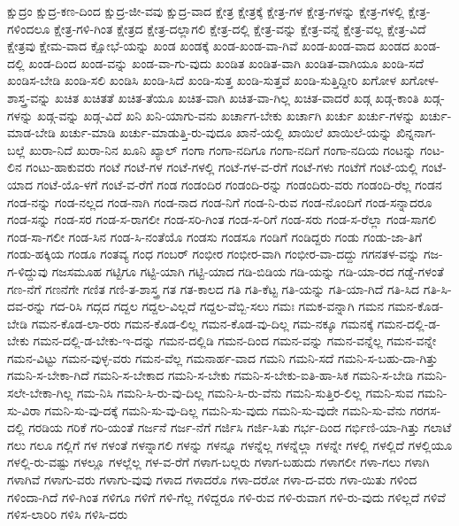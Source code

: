 {ಕ್ಷುದ್ರಂ
ಕ್ಷುದ್ರ-ಕಣ-ದಿಂದ
ಕ್ಷುದ್ರ-ಜೀ-ವವು
ಕ್ಷುದ್ರ-ವಾದ
ಕ್ಷೇತ್ರ
ಕ್ಷೇತ್ರಕ್ಕೆ
ಕ್ಷೇತ್ರ-ಗಳ
ಕ್ಷೇತ್ರ-ಗಳನ್ನು
ಕ್ಷೇತ್ರ-ಗಳಲ್ಲಿ
ಕ್ಷೇತ್ರ-ಗಳಿಂದಲೂ
ಕ್ಷೇತ್ರ-ಗಳಿ-ಗಿಂತ
ಕ್ಷೇತ್ರದ
ಕ್ಷೇತ್ರ-ದಲ್ಲಾಗಲಿ
ಕ್ಷೇತ್ರ-ದಲ್ಲಿ
ಕ್ಷೇತ್ರ-ವನ್ನು
ಕ್ಷೇತ್ರ-ವನ್ನೆ
ಕ್ಷೇತ್ರ-ವಲ್ಲ
ಕ್ಷೇತ್ರ-ವಿದೆ
ಕ್ಷೇತ್ರವು
ಕ್ಷೇಮ-ವಾದ
ಕ್ಷೋಭೆ-ಯನ್ನು
ಖಂಡ
ಖಂಡಕ್ಕೆ
ಖಂಡ-ಖಂಡ-ವಾ-ಗಿವೆ
ಖಂಡ-ಖಂಡ-ವಾದ
ಖಂಡದ
ಖಂಡ-ದಲ್ಲಿ
ಖಂಡ-ದಿಂದ
ಖಂಡ-ವನ್ನು
ಖಂಡ-ವಾ-ಗು-ವುದು
ಖಂಡಿತ
ಖಂಡಿತ-ವಾಗಿ
ಖಂಡಿತ-ವಾಗಿಯೂ
ಖಂಡಿ-ಸದೆ
ಖಂಡಿಸ-ಬೇಡಿ
ಖಂಡಿ-ಸಲಿ
ಖಂಡಿಸಿ
ಖಂಡಿ-ಸಿದೆ
ಖಂಡಿ-ಸುತ್ತ
ಖಂಡಿ-ಸುತ್ತವೆ
ಖಂಡಿ-ಸುತ್ತಿದ್ದೀರಿ
ಖಗೋಳ
ಖಗೋಳ-ಶಾಸ್ತ್ರ-ವನ್ನು
ಖಚಿತ
ಖಚಿತತೆ
ಖಚಿತ-ತೆಯೂ
ಖಚಿತ-ವಾಗಿ
ಖಚಿತ-ವಾ-ಗಿಲ್ಲ
ಖಚಿತ-ವಾದರೆ
ಖಡ್ಗ
ಖಡ್ಗ-ಕಾಂತಿ
ಖಡ್ಗ-ಗಳನ್ನು
ಖಡ್ಗ-ವನ್ನು
ಖಡ್ಗ-ವಿದೆ
ಖನಿ
ಖನಿ-ಯಾಗು-ವನು
ಖರ್ಚಾಗ-ಬೇಕು
ಖರ್ಚಾಗಿ
ಖರ್ಚು
ಖರ್ಚು-ಗಳನ್ನು
ಖರ್ಚು-ಮಾಡ-ಬೇಡಿ
ಖರ್ಚು-ಮಾಡಿ
ಖರ್ಚು-ಮಾಡುತ್ತಿ-ರು-ವುದೂ
ಖಾನೆ-ಯಲ್ಲಿ
ಖಾಯಿಲೆ
ಖಾಯಿಲೆ-ಯನ್ನು
ಖಿನ್ನನಾಗ-ಬಲ್ಲೆ
ಖುರಾ-ನಿದೆ
ಖುರಾ-ನಿನ
ಖೂನಿ
ಖ್ಯಾಲ್
ಗಂಗಾ
ಗಂಗಾ-ನದಿಗೂ
ಗಂಗಾ-ನದಿಗೆ
ಗಂಗಾ-ನದಿಯ
ಗಂಟನ್ನು
ಗಂಟ-ಲಿನ
ಗಂಟು-ಹಾಕುವರು
ಗಂಟೆ
ಗಂಟೆ-ಗಳ
ಗಂಟೆ-ಗಳಲ್ಲಿ
ಗಂಟೆ-ಗಳ-ವ-ರೆಗೆ
ಗಂಟೆ-ಗಳು
ಗಂಟೆಗೆ
ಗಂಟೆ-ಯಲ್ಲಿ
ಗಂಟೆ-ಯಾದ
ಗಂಟೆ-ಯೊ-ಳಗೆ
ಗಂಟೆ-ವ-ರೆಗೆ
ಗಂಡ
ಗಂಡಂದಿರ
ಗಂಡಂದಿ-ರನ್ನು
ಗಂಡಂದಿರು-ವರು
ಗಂಡಂದಿ-ರೆಲ್ಲ
ಗಂಡನ
ಗಂಡ-ನನ್ನು
ಗಂಡ-ನಲ್ಲದ
ಗಂಡ-ನಾಗಿ
ಗಂಡ-ನಾದ
ಗಂಡ-ನಿಗೆ
ಗಂಡ-ನಿ-ರುವ
ಗಂಡ-ನೊಂದಿಗೆ
ಗಂಡ-ಸನ್ನಾದರೂ
ಗಂಡ-ಸನ್ನು
ಗಂಡ-ಸರ
ಗಂಡ-ಸ-ರಾಗಲೀ
ಗಂಡ-ಸರಿ-ಗಿಂತ
ಗಂಡ-ಸ-ರಿಗೆ
ಗಂಡ-ಸರು
ಗಂಡ-ಸ-ರೆಲ್ಲಾ
ಗಂಡ-ಸಾಗಲಿ
ಗಂಡ-ಸಾ-ಗಲೀ
ಗಂಡ-ಸಿನ
ಗಂಡ-ಸಿ-ನಂತೆಯೊ
ಗಂಡಸು
ಗಂಡಸೂ
ಗಂಡಿಗೆ
ಗಂಡಿದ್ದರು
ಗಂಡು
ಗಂಡು-ಜಾ-ತಿಗೆ
ಗಂಡು-ಹಕ್ಕಿಯ
ಗಂಡೂ
ಗಂತವ್ಯ
ಗಂಧ
ಗಂಬರ್
ಗಂಭೀರ
ಗಂಭೀರ-ವಾಗಿ
ಗಂಭೀರ-ವಾ-ದದ್ದು
ಗಗನತಳ-ವನ್ನು
ಗಜ-ಗ-ಳಿದ್ದುವು
ಗಜಸಮೂಹ
ಗಟ್ಟಿಗೂ
ಗಟ್ಟಿ-ಯಾಗಿ
ಗಟ್ಟಿ-ಯಾದ
ಗಡಿ-ಬಿಡಿಯ
ಗಡಿ-ಯನ್ನು
ಗಡಿ-ಯಾ-ರದ
ಗಡ್ಡೆ-ಗಳಂತೆ
ಗಣ-ನೆಗೆ
ಗಣನೆಗೇ
ಗಣಿತ
ಗಣಿ-ತ-ಶಾಸ್ತ್ರ
ಗತ
ಗತ-ಕಾಲದ
ಗತಿ
ಗತಿ-ಕೆಟ್ಟ
ಗತಿ-ಯನ್ನು
ಗತಿ-ಯಾ-ಗಿದೆ
ಗತಿ-ಸಿದ
ಗತಿ-ಸಿ-ದವ-ರನ್ನು
ಗದ-ರಿಸಿ
ಗದ್ಗದ
ಗದ್ದಲ
ಗದ್ದಲ-ವಿಲ್ಲದೆ
ಗದ್ದಲ-ವೆಬ್ಬಿ-ಸಲು
ಗಮಃ
ಗಮಕ-ವನ್ನಾಗಿ
ಗಮನ
ಗಮನ-ಕೊಡ-ಬೇಡಿ
ಗಮನ-ಕೊಡ-ಲಾ-ರರು
ಗಮನ-ಕೊಡ-ಲಿಲ್ಲ
ಗಮನ-ಕೊಡ-ವು-ದಿಲ್ಲ
ಗಮ-ನಕ್ಕೂ
ಗಮನಕ್ಕೆ
ಗಮನ-ದಲ್ಲಿ-ಡ-ಬೇಕು
ಗಮನ-ದಲ್ಲಿ-ಡ-ಬೇಕು-ಇ-ದನ್ನು
ಗಮನ-ದಲ್ಲಿಡಿ
ಗಮನ-ದಿಂದ
ಗಮನ-ವನ್ನು
ಗಮನ-ವನ್ನೆಲ್ಲ
ಗಮನ-ವನ್ನೇ
ಗಮನ-ವಿಟ್ಟು
ಗಮನ-ವುಳ್ಳ-ವರು
ಗಮನ-ವೆಲ್ಲ
ಗಮನಾರ್ಹ-ವಾದ
ಗಮನಿ
ಗಮನಿ-ಸದೆ
ಗಮನಿ-ಸ-ಬಹು-ದಾ-ಗಿತ್ತು
ಗಮನಿ-ಸ-ಬೇಕಾ-ಗಿದೆ
ಗಮನಿ-ಸ-ಬೇಕಾದ
ಗಮನಿ-ಸ-ಬೇಕು
ಗಮನಿ-ಸ-ಬೇಕು-ಐತಿ-ಹಾ-ಸಿಕ
ಗಮನಿ-ಸ-ಬೇಡಿ
ಗಮನಿ-ಸಲೇ-ಬೇಕಾ-ಗಿಲ್ಲ
ಗಮ-ನಿಸಿ
ಗಮನಿ-ಸಿ-ರು-ವು-ದಿಲ್ಲ
ಗಮನಿ-ಸಿ-ರು-ವೆನು
ಗಮನಿ-ಸುತ್ತಿರ-ಲಿಲ್ಲ
ಗಮನಿ-ಸುವ
ಗಮನಿ-ಸು-ವಿರಾ
ಗಮನಿ-ಸು-ವು-ದಕ್ಕೆ
ಗಮನಿ-ಸು-ವು-ದಿಲ್ಲ
ಗಮನಿ-ಸು-ವುದು
ಗಮನಿ-ಸು-ವುದೇ
ಗಮನಿ-ಸು-ವೆನು
ಗರಗಸ-ದಲ್ಲಿ
ಗರಡಿಯ
ಗರಿಕೆ
ಗರಿ-ಯಂತೆ
ಗರ್ಜನೆ
ಗರ್ಜ-ನೆಗೆ
ಗರ್ಜಿಸಿ
ಗರ್ಜಿ-ಸಿತು
ಗರ್ಭ-ದಿಂದ
ಗರ್ಭಿಣಿ-ಯಾ-ಗಿತ್ತು
ಗಲಾಟೆ
ಗಲು
ಗಲೂ
ಗಲ್ಲಿಗೆ
ಗಳ
ಗಳಂತೆ
ಗಳನ್ನಾಗಲಿ
ಗಳನ್ನು
ಗಳನ್ನೂ
ಗಳನ್ನೆಲ್ಲ
ಗಳನ್ನೆಲ್ಲಾ
ಗಳನ್ನೇ
ಗಳಲ್ಲಿ
ಗಳಲ್ಲಿದೆ
ಗಳಲ್ಲಿಯೂ
ಗಳಲ್ಲಿ-ರು-ವಷ್ಟು
ಗಳಲ್ಲೂ
ಗಳಲ್ಲೆಲ್ಲ
ಗಳ-ವ-ರೆಗೆ
ಗಳಾಗ-ಬಲ್ಲರು
ಗಳಾಗ-ಬಹುದು
ಗಳಾಗಲೀ
ಗಳಾ-ಗಲು
ಗಳಾಗಿ
ಗಳಾಗಿವೆ
ಗಳಾಗು-ವರು
ಗಳಾಗು-ವುವು
ಗಳಾದ
ಗಳಾದರೊ
ಗಳಾ-ದರೋ
ಗಳಾ-ದ-ವರು
ಗಳಾ-ಯಿತು
ಗಳಿಂದ
ಗಳಿಂದಾ-ಗಿದೆ
ಗಳಿ-ಗಿಂತ
ಗಳಿಗೂ
ಗಳಿಗೆ
ಗಳಿ-ಗೆಲ್ಲ
ಗಳಿದ್ದರೂ
ಗಳಿ-ರುವ
ಗಳಿ-ರುವಾಗ
ಗಳಿ-ರು-ವುದು
ಗಳಿಲ್ಲದೆ
ಗಳಿವೆ
ಗಳಿಸ-ಲಾರಿರಿ
ಗಳಿಸಿ
ಗಳಿಸಿ-ದರು
}
